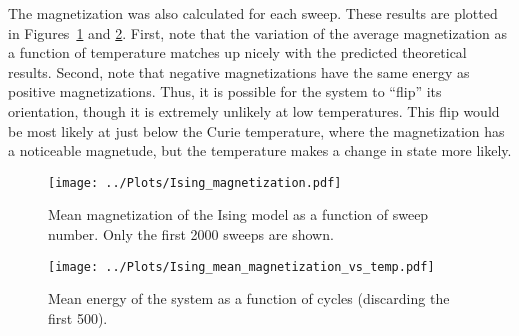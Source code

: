 \documentclass[twocolumn]{myarticle}
\begin{document}
The magnetization was also calculated for each sweep.
These results are plotted in Figures~\ref{fig:ising_magnetization} and \ref{fig:ising_mean_magnetization_vs_temp}.
First, note that the variation of the average magnetization as a function of temperature matches up nicely with the predicted theoretical results.
Second, note that negative magnetizations have the same energy as positive magnetizations.
Thus, it is possible for the system to ``flip'' its orientation, though it is extremely unlikely at low temperatures.
This flip would be most likely at just below the Curie temperature, where the magnetization has a noticeable magnetude, but the temperature makes a change in state more likely.

\begin{figure}[ht!]
    \begin{center}
    \texttt{[image: ../Plots/Ising\_magnetization.pdf]}
    \caption{%
        Mean magnetization of the Ising model as a function of sweep number.
        Only the first 2000 sweeps are shown.
    }
    \label{fig:ising_magnetization}
    \end{center}
\end{figure}

\begin{figure}[ht!]
    \begin{center}
    \texttt{[image: ../Plots/Ising\_mean\_magnetization\_vs\_temp.pdf]}
    \caption{%
        Mean energy of the system as a function of cycles (discarding the first 500).
    }
    \label{fig:ising_mean_magnetization_vs_temp}
    \end{center}
\end{figure}
\end{document}
